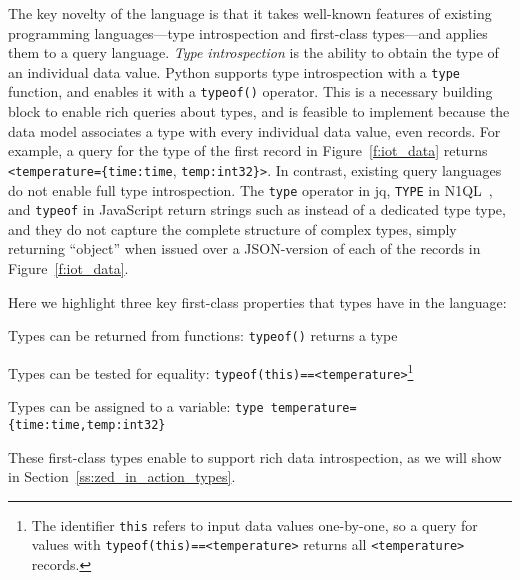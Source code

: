The key novelty of the \sys{} language is that it takes well-known features of existing programming languages---type introspection and first-class types---and applies them to a query language. {\em Type introspection} is the ability to obtain the type of an individual data value. Python supports type introspection with a \texttt{type} function, and \sys{} enables it with a \texttt{typeof()} operator. This is a necessary building block to enable rich queries about types, and is feasible to implement because the \sys{} data model associates a type with every individual data value, even records. For example, a query for the type of the first record in Figure~\ref{f:iot_data} returns \texttt{<temperature=\{time:time}, \texttt{temp:int32\}>}.
In contrast, existing query languages do not enable full type introspection. The \texttt{type} operator in jq, \texttt{TYPE} in N1QL~\cite{n1ql}, and \texttt{typeof} in JavaScript return strings such as  instead of a dedicated type type, and they do not capture the complete structure of complex types, simply returning ``object'' when issued over a JSON-version of each of the records in Figure~\ref{f:iot_data}.


 Here we highlight three key first-class properties that types have in the \sys{} language:
\begin{CompactItemize}
    \item Types can be returned from functions: \texttt{typeof()} returns a type
    \item Types can be tested for equality: \texttt{typeof(this)==<temperature>}\footnote{The identifier \texttt{this} refers to input data values one-by-one, so a query for values with \texttt{typeof(this)==<temperature>} returns all \texttt{<temperature>} records.}
    \item Types can be assigned to a variable: \newline{} \texttt{type temperature=\{time:time,temp:int32\}}
\end{CompactItemize}
These first-class types enable \sys{} to support rich data introspection, as we will show in Section~\ref{ss:zed_in_action_types}.

